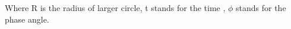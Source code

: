 \documentclass[preview]{standalone}
\begin{document}
\begin{center}
Where R is the radius of larger circle, t stands for the time , $\phi$ stands for the phase angle.
\end{center}
\end{document}
